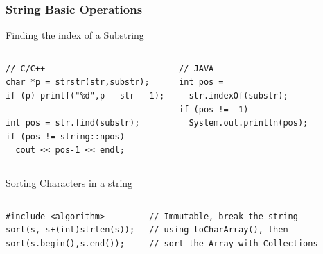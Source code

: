 \begin{frame}[fragile]
  \frametitle{String Basic Operations}
  {\smaller
    \begin{block}{Finding the index of a Substring}
      \begin{columns}[T]
\begin{verbatim}
// C/C++
char *p = strstr(str,substr);
if (p) printf("%d",p - str - 1);

int pos = str.find(substr);
if (pos != string::npos)
  cout << pos-1 << endl;
\end{verbatim}
\begin{verbatim}
// JAVA
int pos =
  str.indexOf(substr);
if (pos != -1)
  System.out.println(pos);
\end{verbatim}
      \end{columns}
    \end{block}
    \begin{block}{Sorting Characters in a string}
      \begin{columns}[T]
\begin{verbatim}
#include <algorithm>
sort(s, s+(int)strlen(s));
sort(s.begin(),s.end());
\end{verbatim}
\begin{verbatim}
// Immutable, break the string
// using toCharArray(), then
// sort the Array with Collections
\end{verbatim}
      \end{columns}
    \end{block}
  }
\end{frame}

%

